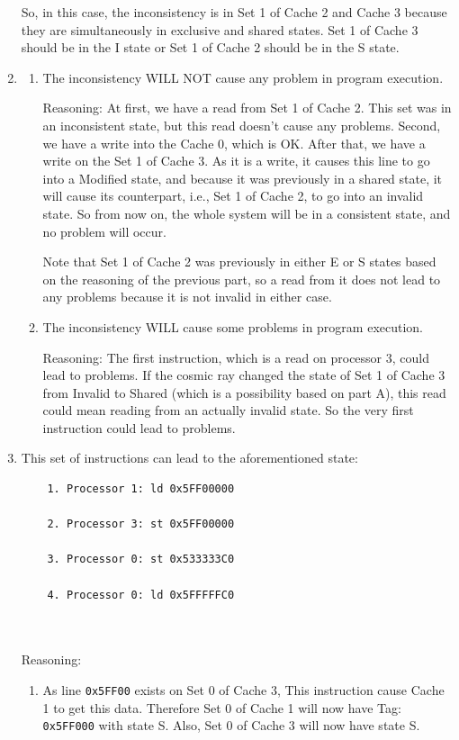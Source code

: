 \documentclass[12pt]{article}
\begin{document}
\begin{enumerate}[label=\alph*.]
So, in this case, the inconsistency is in Set 1 of Cache 2 and Cache 3 because they are simultaneously in exclusive and shared states. Set 1 of Cache 3 should be in the I state or Set 1 of Cache 2 should be in the S state.

\item 

\begin{enumerate}[label=B\arabic*.]
	\item The inconsistency WILL NOT cause any problem in program execution.
	
	Reasoning: At first, we have a read from Set 1 of Cache 2. This set was in an inconsistent state, but this read doesn't cause any problems. Second, we have a write into the Cache 0, which is OK. After that, we have a write on the Set 1 of Cache 3. As it is a write, it causes this line to go into a Modified state, and because it was previously in a shared state, it will cause its counterpart, i.e., Set 1 of Cache 2, to go into an invalid state. So from now on, the whole system will be in a consistent state, and no problem will occur.
	
	Note that Set 1 of Cache 2 was previously in either E or S states based on the reasoning of the previous part, so a read from it does not lead to any problems because it is not invalid in either case.
	
	\item The inconsistency WILL cause some problems in program execution.
	
	Reasoning: The first instruction, which is a read on processor 3, could lead to problems. If the cosmic ray changed the state of Set 1 of Cache 3 from Invalid to Shared (which is a possibility based on part A), this read could mean reading from an actually invalid state. So the very first instruction could lead to problems.
\end{enumerate}
\item 
This set of instructions can lead to the aforementioned state:

\begin{verbatim}
	1. Processor 1: ld 0x5FF00000
	
	2. Processor 3: st 0x5FF00000
	
	3. Processor 0: st 0x533333C0
	
	4. Processor 0: ld 0x5FFFFFC0
	
	
\end{verbatim}


Reasoning:

\begin{enumerate}[label=\arabic*.]
	\item As line \Verb+0x5FF00+ exists on Set 0 of Cache 3, This instruction cause Cache 1 to get this data. Therefore Set 0 of Cache 1 will now have Tag: \Verb+0x5FF000+ with state S. Also, Set 0 of Cache 3 will now have state S.
	

\end{enumerate}
\end{enumerate}
\end{document}

